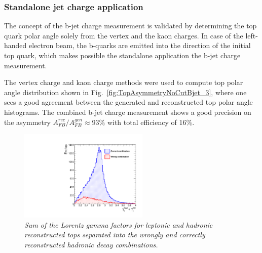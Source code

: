 \subsubsection{Standalone jet charge application}
The concept of the b-jet charge measurement is validated by determining the top quark polar angle solely from the vertex and the kaon charges. 
In case of the left-handed electron beam, the b-quarks are emitted into the direction of the initial top quark, which makes possible the standalone application the b-jet charge measurement. 

The vertex charge and kaon charge methods were used to compute top polar angle distribution shown in Fig.~\ref{fig:TopAsymmetryNoCutBjet_3}, where one sees a good agreement between the generated and reconstructed top polar angle histograms. 
The combined b-jet charge measurement shows a good precision on the asymmetry $A_{FB}^{rec}/A^{gen}_{FB} \approx 93\%$ with total efficiency of 16\%.
\begin{figure}
	{\centering
		\includegraphics[width=0.55\textwidth]{ILD/plots/top-gamma.pdf}
		\caption{\sl Sum of the Lorentz gamma factors for leptonic and hadronic reconstructed tops separated into the wrongly and correctly reconstructed hadronic decay combinations.
		}
		\label{fig:TopGamma_3}
	}
	
\end{figure}

